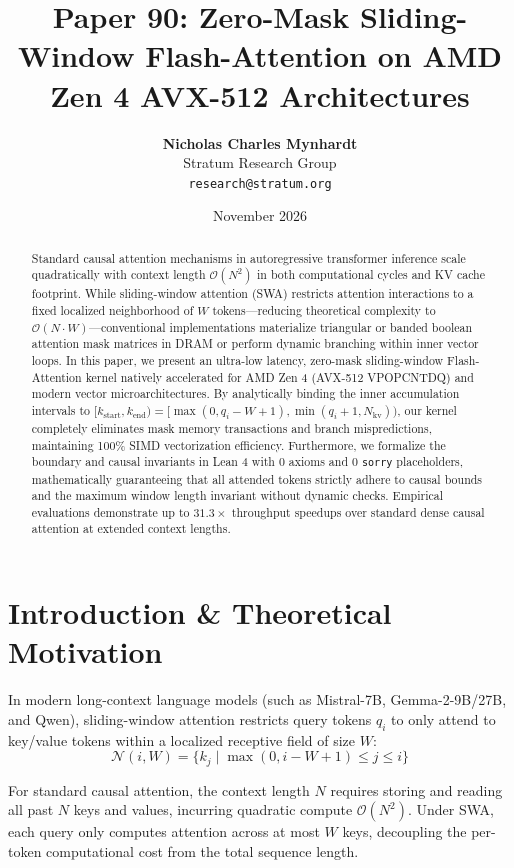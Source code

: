 \documentclass[10pt,twocolumn,letterpaper]{article}
\title{\textbf{Paper 90: Zero-Mask Sliding-Window Flash-Attention on AMD Zen 4 AVX-512 Architectures}}
\author{
  \textbf{Nicholas Charles Mynhardt} \\
  Stratum Research Group \\
  \texttt{research@stratum.org}
}
\date{November 2026}
\begin{document}
\maketitle

\begin{abstract}
Standard causal attention mechanisms in autoregressive transformer inference scale quadratically with context length $\mathcal{O}(N^2)$ in both computational cycles and KV cache footprint. While sliding-window attention (SWA) restricts attention interactions to a fixed localized neighborhood of $W$ tokens---reducing theoretical complexity to $\mathcal{O}(N \cdot W)$---conventional implementations materialize triangular or banded boolean attention mask matrices in DRAM or perform dynamic branching within inner vector loops. In this paper, we present an ultra-low latency, zero-mask sliding-window Flash-Attention kernel natively accelerated for AMD Zen 4 (AVX-512 VPOPCNTDQ) and modern vector microarchitectures. By analytically binding the inner accumulation intervals to $[k_{\text{start}}, k_{\text{end}}) = [\max(0, q_i - W + 1), \min(q_i + 1, N_{\text{kv}}))$, our kernel completely eliminates mask memory transactions and branch mispredictions, maintaining 100\% SIMD vectorization efficiency. Furthermore, we formalize the boundary and causal invariants in Lean 4 with 0 axioms and 0 \texttt{sorry} placeholders, mathematically guaranteeing that all attended tokens strictly adhere to causal bounds and the maximum window length invariant without dynamic checks. Empirical evaluations demonstrate up to $31.3\times$ throughput speedups over standard dense causal attention at extended context lengths.
\end{abstract}

\section{Introduction \& Theoretical Motivation}

In modern long-context language models (such as Mistral-7B, Gemma-2-9B/27B, and Qwen), sliding-window attention restricts query tokens $q_i$ to only attend to key/value tokens within a localized receptive field of size $W$:
\begin{equation}
\mathcal{N}(i, W) = \{k_j \mid \max(0, i - W + 1) \le j \le i\}
\end{equation}

For standard causal attention, the context length $N$ requires storing and reading all past $N$ keys and values, incurring quadratic compute $\mathcal{O}(N^2)$. Under SWA, each query only computes attention across at most $W$ keys, decoupling the per-token computational cost from the total sequence length.
\end{document}
